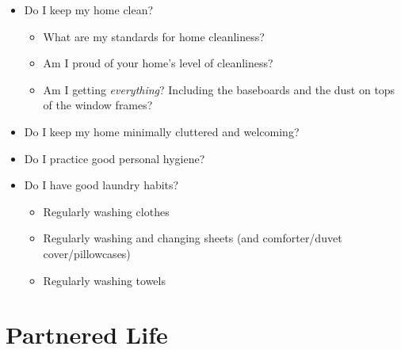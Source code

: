 \begin{itemize}
\item Do I keep my home clean?

\begin{itemize}
\item What are my standards for home cleanliness?

\item Am I proud of your home's level of cleanliness?

\item Am I getting \emph{everything}? Including the baseboards and the dust on tops of the window frames?

\end{itemize}

\item Do I keep my home minimally cluttered and welcoming?

\item Do I practice good personal hygiene?

\item Do I have good laundry habits?

\begin{itemize}
\item Regularly washing clothes

\item Regularly washing and changing sheets (and comforter\slash duvet cover\slash pillowcases)

\item Regularly washing towels

\end{itemize}

\end{itemize}

\part{Partnered Life}
\label{partneredlife}

